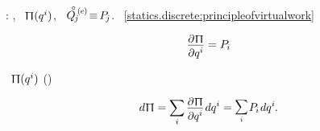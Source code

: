 \::
,
~${\potentialenergyinmechanics (q^i)}$,
~${{\mathcircabove{Q_{\hspace{-0.2ex}j}}^{\hspace{-0.5ex}\smthexternal}} \hspace{-0.25ex} \equiv \hspace{-0.25ex} P_{\hspace{-0.2ex}j}}$.
~\eqref{statics.discrete:principleofvirtualwork}

\nopagebreak\vspace{-0.2em}
\begin{equation}\label{staticequilibrium.withpotentialandexternalforces}
\scalebox{.96}{$ \displaystyle \frac{\raisemath{-0.15em}{\partial \hspace{.1ex} \potentialenergyinmechanics}}{\raisemath{-0.1em}{\partial q^i}} $} = P_{\hspace{-0.1ex}i}
\end{equation}

\vspace{-0.5em}\noindent
{}
~${\potentialenergyinmechanics (q^i)}$
()

\nopagebreak\vspace{-0.1em}
\begin{equation}\label{fulldifferentialoftimeindependentpotentialenergy}
d \hspace{.1ex} \potentialenergyinmechanics
= \scalebox{.95}[1]{$\displaystyle \sum_{\smash{i}}$} \hspace{.32ex}
\scalebox{.96}{$ \displaystyle \frac{\raisemath{-0.15em}{\partial \hspace{.1ex} \potentialenergyinmechanics}}{\raisemath{-0.1em}{\partial q^i}} $} \hspace{.2ex} dq^i
= \raisebox{.1em}{\scalebox{.8}[.9]{$\displaystyle \sum_{\smash{i}}$}} \hspace{.2ex} P_{\hspace{-0.1ex}i} \hspace{.2ex} dq^i
\hspace{-0.1ex} .
\end{equation}

